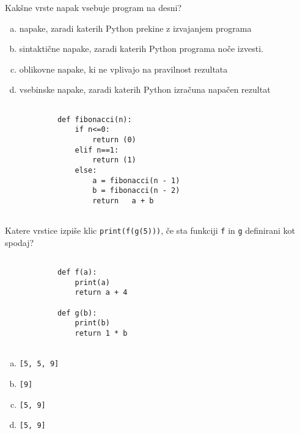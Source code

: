 \documentclass[arhiv, 10pt]{../izpit}
\newcommand{\inlinepy}[1]{\texttt{#1}}
\begin{document}
        \naloga*
        \begin{multicols}{2}
        \noindent
        Kakšne vrste napak vsebuje program na desni?

        \begin{enumerate}[(a)]
\item napake, zaradi katerih Python prekine z izvajanjem programa
\item sintaktične napake, zaradi katerih Python programa noče izvesti.
\item oblikovne napake, ki ne vplivajo na pravilnost rezultata
\item vsebinske napake, zaradi katerih Python izračuna napačen rezultat
\end{enumerate}

        \columnbreak

        \begin{verbatim}
        
            def fibonacci(n):
                if n<=0:
                    return (0)
                elif n==1:
                    return (1)
                else:
                    a = fibonacci(n - 1)
                    b = fibonacci(n - 2)
                    return   a + b
            
        \end{verbatim}

        \end{multicols}

    
        \naloga*
        Katere vrstice izpiše klic \inlinepy{print(f(g(5)))}, če sta funkciji \inlinepy{f} in \inlinepy{g} definirani kot spodaj?

        \begin{multicols}{2}
        \begin{verbatim}
        
            def f(a):
                print(a)
                return a + 4

            def g(b):
                print(b)
                return 1 * b
        
        \end{verbatim}

        \begin{enumerate}[(a)]
\item \inlinepy{[5, 5, 9]}
\item \inlinepy{[9]}
\item \inlinepy{[5, 9]}
\item \inlinepy{[5, 9]}
\end{enumerate}

        \end{multicols}
    
\end{document}
